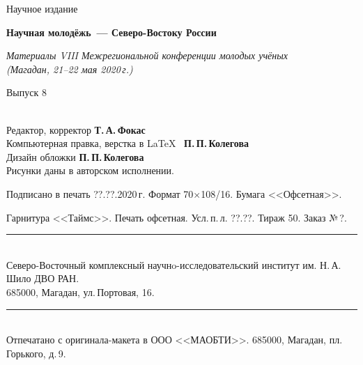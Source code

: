 \thispagestyle{empty}
\hspace{2cm}
\vfill
\begin{center}
  {Научное издание}

  \medskip
  \bigskip
  \textbf{\large Научная молодёжь~--- Северо-Востоку России}

  \medskip
  \textit{Материалы VIII Межрегиональной конференции молодых учёных\\ (Магадан,
  21--22 мая 2020\,г.)}

  \vfill
  Выпуск 8
\end{center}
\vfill

\hspace{2cm}\\ \small
Редактор, корректор \textbf{Т.\,А.\,Фокас}\\
Компьютерная правка, верстка в \LaTeX~ \textbf{П.\,П.\,Колегова}\\
Дизайн обложки \textbf{П.\,П.\,Колегова}\\
Рисунки даны в авторском исполнении.

\vfill

\enlargethispage{5\baselineskip}
\begin{changemargin}{-2cm}{-2cm}
\begin{center}
  \footnotesize
  Подписано в печать ??.??.2020\,г.  Формат 70$\times$108/16. Бумага
  <<Офсетная>>.\hspace*{2em}

  Гарнитура <<Таймс>>. Печать офсетная.  Усл.\,п.\,л. ??.??.  Тираж 50. Заказ №\,?.
  \rule{1.1\textwidth}{.1mm}\\
  Северо-Восточный комплексный научнo-исследовательский институт им.
  Н.\,А.\,Шило ДВО РАН. \\ 685000, Магадан, ул.\,Портовая, 16. \\
  \rule{1.1\textwidth}{.1mm}\\
  Отпечатано с оригинала-макета в ООО <<МАОБТИ>>.  685000, Магадан,
  пл.\,Горького, д.\,9.
\end{center}
\end{changemargin}

